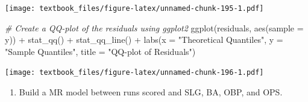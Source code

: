 \documentclass[
  11pt,
]{book}
\newenvironment{Shaded}{\begin{snugshade}}{\end{snugshade}}
\newcommand{\AttributeTok}[1]{\textcolor[rgb]{0.77,0.63,0.00}{#1}}
\newcommand{\CommentTok}[1]{\textcolor[rgb]{0.56,0.35,0.01}{\textit{#1}}}
\newcommand{\FunctionTok}[1]{\textcolor[rgb]{0.00,0.00,0.00}{#1}}
\newcommand{\NormalTok}[1]{#1}
\newcommand{\SpecialCharTok}[1]{\textcolor[rgb]{0.00,0.00,0.00}{#1}}
\newcommand{\StringTok}[1]{\textcolor[rgb]{0.31,0.60,0.02}{#1}}
\providecommand{\tightlist}{%
  \setlength{\itemsep}{0pt}\setlength{\parskip}{0pt}}
\theoremstyle{definition}
\theoremstyle{definition}
\theoremstyle{definition}
\theoremstyle{definition}
\theoremstyle{remark}
\begin{document}
\texttt{[image: textbook\_files/figure-latex/unnamed-chunk-195-1.pdf]}

\newpage

\begin{Shaded}
\begin{Highlighting}[]
\CommentTok{\# Create a QQ{-}plot of the residuals using ggplot2}
\FunctionTok{ggplot}\NormalTok{(residuals, }\FunctionTok{aes}\NormalTok{(}\AttributeTok{sample =}\NormalTok{ y)) }\SpecialCharTok{+}
  \FunctionTok{stat\_qq}\NormalTok{() }\SpecialCharTok{+}
  \FunctionTok{stat\_qq\_line}\NormalTok{() }\SpecialCharTok{+}
  \FunctionTok{labs}\NormalTok{(}\AttributeTok{x =} \StringTok{"Theoretical Quantiles"}\NormalTok{, }\AttributeTok{y =} \StringTok{"Sample Quantiles"}\NormalTok{, }\AttributeTok{title =} \StringTok{"QQ{-}plot of Residuals"}\NormalTok{)}
\end{Highlighting}
\end{Shaded}

\texttt{[image: textbook\_files/figure-latex/unnamed-chunk-196-1.pdf]}

\newpage

\begin{enumerate}
\def\labelenumi{(\alph{enumi})}
\setcounter{enumi}{5}
\tightlist
\item
  Build a MR model between runs scored and SLG, BA, OBP, and OPS.
\end{enumerate}
\end{document}
